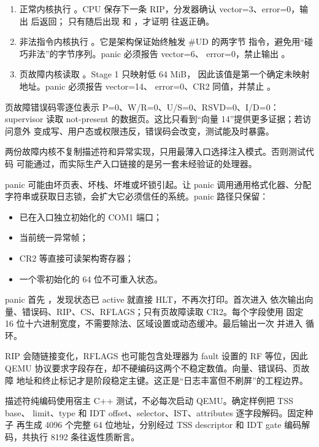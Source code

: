 \begin{enumerate}
  \item 正常内核执行 。CPU 保存下一条 RIP，分发器确认
        vector=3、error=0，输出  后返回；
        只有随后出现  和
        ，才证明  往返正确。
  \item 非法指令内核执行 。它是架构保证始终触发 \#UD 的两字节
        指令，避免用“碰巧非法”的字节序列。panic 必须报告 vector=6、
        error=0，禁止输出 。
  \item 页故障内核读取 。Stage 1 只映射低 64 MiB，
        因此该值是第一个确定未映射地址。panic 必须报告 vector=14、
        error=0、CR2 同值，并禁止 。
\end{enumerate}

页故障错误码零逐位表示 P=0、W/R=0、U/S=0、RSVD=0、I/D=0：supervisor
读取 not-present 的数据页。这比只看到“向量 14”提供更多证据；若访问意外
变成写、用户态或权限违反，错误码会改变，测试能及时暴露。

两份故障内核不复制描述符和异常实现，只用最薄入口选择注入模式。否则测试代码
可能通过，而实际生产入口链接的是另一套未经验证的处理器。

panic 可能由坏页表、坏栈、坏堆或坏锁引起。让 panic 调用通用格式化器、分配
字符串或获取日志锁，会扩大它必须信任的系统。panic 路径只保留：

\begin{itemize}
  \item 已在入口独立初始化的 COM1 端口；
  \item 当前统一异常帧；
  \item CR2 等直接可读架构寄存器；
  \item 一个零初始化的 64 位不可重入状态。
\end{itemize}

panic 首先 ，发现状态已 active 就直接 HLT，不再次打印。首次进入
依次输出向量、错误码、RIP、CS、RFLAGS；只有页故障读取 CR2。每个字段使用
固定 16 位十六进制宽度，不需要除法、区域设置或动态缓冲。最后输出一次
 并进入  循环。

RIP 会随链接变化，RFLAGS 也可能包含处理器为 fault 设置的 RF 等位，因此
QEMU 协议要求字段存在，却不硬编码这两个不稳定数值。向量、错误码、页故障
地址和终止标记才是阶段稳定主键。这正是“日志丰富但不刷屏”的工程边界。

描述符纯编码使用宿主 C++ 测试，不必每次启动 QEMU。确定样例把 TSS base、
limit、type 和 IDT offset、selector、IST、attributes 逐字段解码。固定种子
 再生成 4096 个完整 64 位地址，分别经过 TSS
descriptor 和 IDT gate 编码解码，共执行 8192 条往返性质断言。

